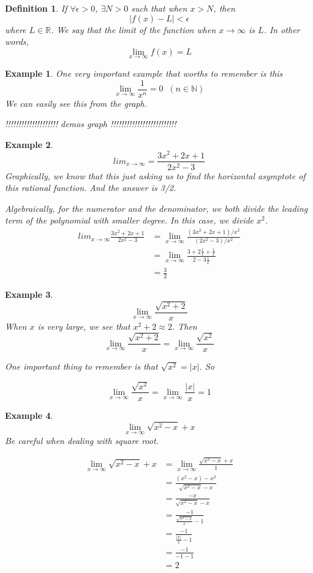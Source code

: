 \documentclass{article}
\newtheorem{definition}{Definition}
\newtheorem{ex}{Example}
\begin{document}
\begin{definition}
	If $\forall \epsilon >0$, $\exists N>0$ such that when $x>N$, then 
	\[ |f(x) -L |< \epsilon \]
	where $L\in\mathbb{R}$. We say that the limit of the function when $x\to \infty$ is $L$. In other words,
	\[ \lim_{x\to\infty} f(x) = L \]
\end{definition}

\begin{ex}
	One very important example that worths to remember is this
	\[ \lim_{x\to\infty} \frac{1}{x^n} =0\;\;(n\in\mathbb{N}) \]
	We can easily see this from the graph.
	\begin{center}
		!!!!!!!!!!!!!!!!!!!! demos graph !!!!!!!!!!!!!!!!!!!!!!!!!
	\end{center}
\end{ex}

\begin{ex}
	\[ lim_{x\to\infty} = \frac{3x^2+2x+1}{2x^2-3} \]
	Graphically, we know that this just asking us to find the horizontal asymptote of this rational function. And the answer is 3/2.
	
	Algebraically, for the numerator and the denominator, we both divide the leading term of the polynomial with smaller degree. In this case, we divide $x^2$.
	\begin{align*}
	lim_{x\to\infty} \frac{3x^2+2x+1}{2x^2-3}
	&= \lim_{x\to\infty} \frac{(3x^2+2x+1)/x^2}{(2x^2-3)/x^2}\\
	&= \lim_{x\to\infty} \frac{3 + 2\frac{1}{x}+ \frac{1}{x}}{2-3\frac{1}{x}}\\
	&= \frac{3}{2}
	\end{align*}
\end{ex}


\begin{ex}
	\[ \lim_{x\to\infty} \frac{\sqrt{x^2+2}}{x} \]
	When $x$ is very large, we see that $x^2+2 \approx 2$. Then
	\[\lim_{x\to\infty} \frac{\sqrt{x^2+2}}{x} = \lim_{x\to\infty} \frac{\sqrt{x^2}}{x} \]
	
	One important thing to remember is that $\sqrt{x^2}=|x|$. So

	\[\lim_{x\to\infty} \frac{\sqrt{x^2}}{x}  = \lim_{x\to\infty} \frac{|x|}{x}
	= 1\]
\end{ex}


\begin{ex}
	\[ \lim_{x\to\infty} \sqrt{x^2-x} + x \]
	Be careful when dealing with square root.
	
	\begin{align*}
	\lim_{x\to\infty} \sqrt{x^2-x} + x &= \lim_{x\to\infty} \frac{\sqrt{x^2-x} + x}{1}\\
	&= \frac{(x^2 -x) - x^2}{\sqrt{x^2-x} - x}\\
	&= \frac{-x}{\sqrt{x^2-x} - x}\\
	&= \frac{-1}{\frac{\sqrt{x^2-x}}{x} - 1}\\
	&= \frac{-1}{\frac{|x|}{x}-1}\\
	&= \frac{-1}{-1-1}\\
	&= 2
	\end{align*}
\end{ex}
\end{document}

